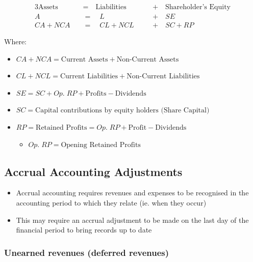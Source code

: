\documentclass{article}
\begin{document}
		\begin{alignat*}{3}
			\text{Assets} \quad &= \quad \text{Liabilities} \quad &&+ \quad \text{Shareholder's Equity}	\\
			A \quad &= \quad L \quad &&+ \quad SE	\\
			CA + NCA \quad &= \quad CL + NCL \quad &&+ \quad SC + RP
		\end{alignat*}

		Where:
		\begin{itemize}
			\item $CA + NCA = \text{Current Assets} + \text{Non-Current Assets}$
			\item $CL + NCL = \text{Current Liabilities} + \text{Non-Current Liabilities}$
			\item $SE = SC + Op. \; RP + \text{Profits} - \text{Dividends}$
			\item $SC = \text{Capital contributions by equity holders (Share Capital)}$
			\item $RP = \text{Retained Profits} = Op.\;RP + \text{Profit} - \text{Dividends}$
				\begin{itemize}
					\item $Op. \; RP = \text{Opening Retained Profits}$
				\end{itemize}
		\end{itemize}

	\subsection{Accrual Accounting Adjustments}

		\begin{itemize}
			\item Accrual accounting requires revenues and expenses to be recognised in the accounting period to which they relate (ie. when they occur)
			\item This may require an accrual adjustment to be made on the last day of the financial period to bring records up to date
		\end{itemize}

		\subsubsection{Unearned revenues (deferred revenues)}
\end{document}
